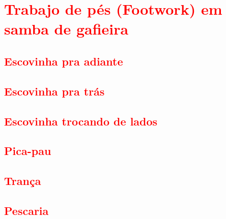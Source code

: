 

\chapter{\textcolor{red}{Trabajo de pés (Footwork) em samba de gafieira}}

\section{\textcolor{red}{Escovinha pra adiante}}

\section{\textcolor{red}{Escovinha pra trás}}

\section{\textcolor{red}{Escovinha trocando de lados}}

\section{\textcolor{red}{Pica-pau}}

\section{\textcolor{red}{Trança}}

\section{\textcolor{red}{Pescaria}}


